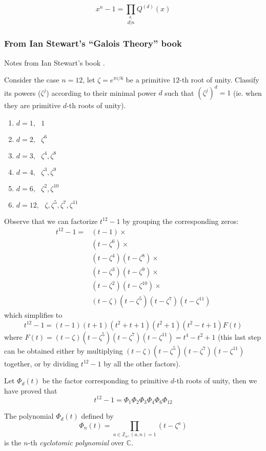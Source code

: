 \documentclass{article}
\theoremstyle{definition}
\newenvironment{defn}[1]
{\renewcommand\theinnerdefn{#1}\innerdefn}
{\endinnerdefn}
\newenvironment{thm}[1]
{\renewcommand\theinnerthm{#1}\innerthm}
{\endinnerthm}
\begin{document}
\begin{thm}{4.32}
  $$x^n -1 = \prod_{\stackrel{d,}{d|n}} Q^{(d)}(x)$$
\end{thm}


\subsubsection{From Ian Stewart's ``Galois Theory'' book}
Notes from Ian Stewart's book \cite{ianstewart}.

Consider the case $n=12$, let $\zeta=e^{\pi i /6}$ be a primitive $12$-th root of unity.
Classify its powers ($\zeta^j$) according to their minimal power $d$ such that
$(\zeta^j)^d = 1$ (ie. when they are primitive $d$-th roots of unity).

\begin{enumerate}[]
  \item $d=1,~~~ 1$
  \item $d=2,~~~ \zeta^6$
  \item $d=3,~~~ \zeta^4, \zeta^8$
  \item $d=4,~~~ \zeta^3, \zeta^9$
  \item $d=6,~~~ \zeta^2, \zeta^{10}$
  \item $d=12,~~~ \zeta, \zeta^5, \zeta^7, \zeta^{11}$
\end{enumerate}

Observe that we can factorize $t^{12} -1$ by grouping the corresponding zeros:
\begin{align*}
  t^{12}-1 = &(t-1) \times\\
	     &(t-\zeta^6) \times\\
	     &(t-\zeta^4) (t-\zeta^8) \times\\
	     &(t-\zeta^3) (t-\zeta^9) \times\\
	     &(t-\zeta^2) (t-\zeta^{10}) \times\\
	     &(t-\zeta) (t-\zeta^5)(t-\zeta^7) (t-\zeta^{11})
\end{align*}
which simplifies to
$$t^{12}-1=(t-1)(t+1)(t^2+t+1)(t^2+1)(t^2-t+1)F(t)$$
where $F(t) = (t-\zeta) (t-\zeta^5)(t-\zeta^7) (t-\zeta^{11}) = t^4 -t^2 + 1$ (this last step can be obtained either by multiplying $(t-\zeta)(t-\zeta^5)(t-\zeta^7) (t-\zeta^{11})$ together, or by dividing $t^{12}-1$ by all the other factors).


Let $\Phi_d(t)$ be the factor corresponding to primitive $d$-th roots of unity, then we have proved that
$$t^{12}-1 = \Phi_1 \Phi_2 \Phi_3 \Phi_4 \Phi_6 \Phi_{12}$$


\begin{defn}{21.5}
  The polynomial $\Phi_d(t)$ defined by
  $$\Phi_n(t) = \prod_{a\in \mathbb{Z}_n,(a,n)=1} (t- \zeta^a)$$
  is the $n$-th \emph{cyclotomic polynomial} over $\mathbb{C}$.
\end{defn}
\end{document}
